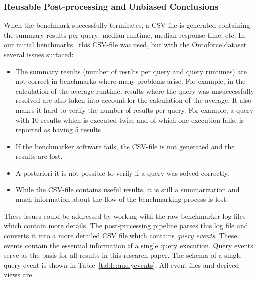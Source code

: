 \subsubsection{Reusable Post-processing and Unbiased Conclusions}

When the benchmark successfully terminates, a CSV-file is generated containing the summary results per query: median runtime, median response time, etc.
In our initial benchmarks~\cite{de2016big} this CSV-file was used, but with the Ontoforce dataset several issues surfaced:

\begin{itemize}
	\item The summary results (number of results per query and query runtimes) are not correct in benchmarks where many problems arise. 
	For example, in the calculation of the average runtime, results where the query was unsuccessfully resolved are also taken into account for the calculation of the average. 
	It also makes it hard to verify the number of results per query. For example, a query with 10 results which is executed twice and of which one execution fails, is reported as having 5 results .
	\item If the benchmarker software fails, the CSV-file is not generated and the results are lost.
	\item A posteriori it is not possible to verify if a query was solved correctly.
	\item While the CSV-file contains useful results, it is still a summarization and much information about the flow of the benchmarking process is lost. 
\end{itemize}

These issues could be addressed by working with the raw benchmarker log files which contain more details.
The post-processing pipeline parses this log file and converts it into a more detailed CSV file which contains \emph{query events}. These events contain the essential information of a single query execution. Query events serve as the basis for all results in this research paper. The schema of a single query event is shown in Table~\ref{table:queryevents}. All event files and derived views are ~\cite{bmresults}.

